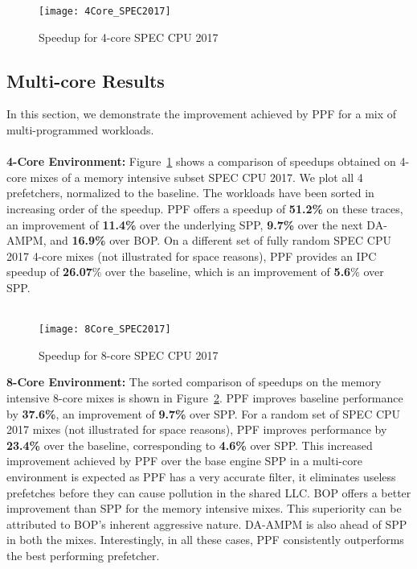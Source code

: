 
\begin{figure}[ht]
\texttt{[image: 4Core\_SPEC2017]}
\caption{Speedup for 4-core SPEC CPU 2017}
\label{Fig:4Core_SPEC2017}
\end{figure}

\subsection{Multi-core Results}
\label{Results-Multi}
In this section, we demonstrate the improvement achieved by PPF for a mix of
multi-programmed workloads.\\ \\
%
\noindent \textbf{4-Core Environment:}
Figure~\ref{Fig:4Core_SPEC2017} shows a comparison of speedups obtained on
4-core mixes of a memory intensive subset SPEC CPU 2017. We plot all 4
prefetchers, normalized to the baseline. The workloads have been sorted in
increasing order of the speedup. PPF offers a speedup of \textbf{51.2\%} on
these traces, an improvement of \textbf{11.4\%} over the underlying SPP,
\textbf{9.7\%} over the next DA-AMPM, and \textbf{16.9\%} over BOP.
On a different set of fully random SPEC CPU 2017 4-core mixes (not illustrated
for space reasons), PPF provides an IPC speedup of \textbf{26.07}\% over the
baseline, which is an improvement of \textbf{5.6}\% over SPP.\\ \\
%
\begin{figure}[ht]
\texttt{[image: 8Core\_SPEC2017]}
\caption{Speedup for 8-core SPEC CPU 2017}
\label{Fig:8Core_SPEC2017}
\end{figure}
%
\noindent \textbf{8-Core Environment:}
The sorted comparison of speedups on the memory intensive 8-core mixes is
shown in Figure~\ref{Fig:8Core_SPEC2017}. PPF improves baseline performance
by \textbf{37.6\%}, an improvement of \textbf{9.7\%} over SPP. For a random
set of SPEC CPU 2017 mixes (not illustrated for space reasons), PPF improves
performance by \textbf{23.4\%} over the baseline, corresponding to
\textbf{4.6\%} over SPP. This increased improvement achieved by PPF over the
base engine SPP in a multi-core environment is expected as PPF has a very
accurate filter, it eliminates useless prefetches before they can cause
pollution in the shared LLC.
BOP offers a better improvement than SPP for the memory intensive mixes. This
superiority can be attributed to BOP's inherent aggressive nature. DA-AMPM is
also ahead of SPP in both the mixes. Interestingly, in all these cases, PPF
consistently outperforms the best performing prefetcher.

